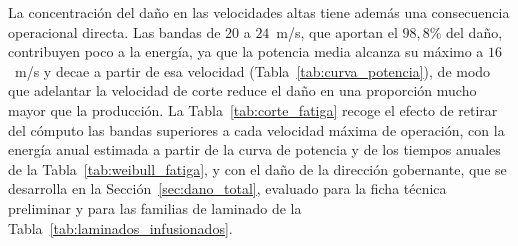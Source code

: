 La concentración del daño en las velocidades altas tiene además una consecuencia operacional directa. Las bandas de $20$ a $24$~m/s, que aportan el $98{,}8\%$ del daño, contribuyen poco a la energía, ya que la potencia media alcanza su máximo a $16$~m/s y decae a partir de esa velocidad (Tabla~\ref{tab:curva_potencia}), de modo que adelantar la velocidad de corte reduce el daño en una proporción mucho mayor que la producción. La Tabla~\ref{tab:corte_fatiga} recoge el efecto de retirar del cómputo las bandas superiores a cada velocidad máxima de operación, con la energía anual estimada a partir de la curva de potencia y de los tiempos anuales de la Tabla~\ref{tab:weibull_fatiga}, y con el daño de la dirección gobernante, que se desarrolla en la Sección~\ref{sec:dano_total}, evaluado para la ficha técnica preliminar y para las familias de laminado de la Tabla~\ref{tab:laminados_infusionados}.

